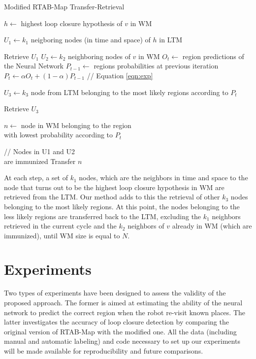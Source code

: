 \documentclass[letterpaper, 10 pt, conference]{ieeeconf}  %
\begin{document}
\begin{algorithm}[] 
\caption{Modified RTAB-Map Transfer-Retrieval}\label{alg:cap}
\begin{algorithmic}[1]
\State $h \gets$ highest loop closure hypothesis of $v$ in WM
\State \parbox[t]{\dimexpr\linewidth-\algorithmicindent}{$U_1 \gets k_1$ neigboring nodes (in time and space) of $h$ in LTM}
\vspace{0.025cm}
\State Retrieve $U_1$
\State $U_2 \gets k_2$ neighboring nodes of $v$ in WM 
\State $O_t \gets$ region predictions of the Neural Network
\State $P_{t-1} \gets$ regions probabilities at previous iteration
\State $P_t \gets \alpha O_t + (1-\alpha)P_{t-1}$  \hfill // Equation \ref{eqn:exp}
\State \parbox[t]{\dimexpr\linewidth-\algorithmicindent}{$U_3 \gets k_3$ node from LTM belonging to the most likely regions according to $P_t$}
\vspace{0.025cm}
\State Retrieve $U_3$
\State 
\parbox[t]{\dimexpr\linewidth-\algorithmicindent}{$n \gets$ node in WM belonging to the region \\with lowest probability according to $P_t$ }
\vspace{0.01cm}
 \hfill // Nodes in U1 and U2\\ \hspace{4.9cm} are immunized 
    \State Transfer $n$
\EndIf
\EndWhile
\EndProcedure
\end{algorithmic}
\label{alg:wm_update}

\end{algorithm}

At each step, a set of $k_1$ nodes, which are the neighbors in time and space to the node that turns out to be the highest loop closure hypothesis in WM are retrieved from the LTM. Our method adds to this the retrieval of other $k_3$ nodes belonging to the most likely regions. At this point, the nodes belonging to the less likely regions are transferred back to the LTM, excluding the $k_1$ neighbors retrieved in the current cycle and the $k_2$ neighbors of $v$ already in WM (which are immunized), until WM size is equal to $N$.

\section{Experiments} \label{experiments}



Two types of experiments have been designed to assess the validity of the proposed approach. The former is aimed at estimating the ability of the neural network to predict the correct region when the robot re-visit known places. The latter investigates the accuracy of loop closure detection by comparing the original version of RTAB-Map with the modified one. All the data (including manual and automatic labeling) and code necessary to set up our experiments will be made available for reproducibility and future comparisons.
\end{document}
